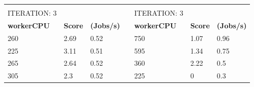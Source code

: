 \begin{table}[H]
\begin{tabular}{lllllll}
                                         &                                     &                                       &                                &                                         &                                     &                                       \\
ITERATION: 3                             &                                     &                                       &                                & ITERATION: 3                            &                                     &                                       \\ \cline{1-3} \cline{5-7} 
\multicolumn{1}{|l|}{\textbf{workerCPU}} & \multicolumn{1}{l|}{\textbf{Score}} & \multicolumn{1}{l|}{\textbf{(Jobs/s)}} & \multicolumn{1}{l|}{\textbf{}} & \multicolumn{1}{l|}{\textbf{workerCPU}} & \multicolumn{1}{l|}{\textbf{Score}} & \multicolumn{1}{l|}{\textbf{(Jobs/s)}} \\ \cline{1-3} \cline{5-7} 
\multicolumn{1}{|l|}{260}                & \multicolumn{1}{l|}{2.69}           & \multicolumn{1}{l|}{0.52}             & \multicolumn{1}{l|}{}          & \multicolumn{1}{l|}{750}                & \multicolumn{1}{l|}{1.07}           & \multicolumn{1}{l|}{0.96}             \\ \cline{1-3} \cline{5-7} 
\multicolumn{1}{|l|}{225}                & \multicolumn{1}{l|}{3.11}           & \multicolumn{1}{l|}{0.51}             & \multicolumn{1}{l|}{}          & \multicolumn{1}{l|}{595}                & \multicolumn{1}{l|}{1.34}           & \multicolumn{1}{l|}{0.75}             \\ \cline{1-3} \cline{5-7} 
\multicolumn{1}{|l|}{265}                & \multicolumn{1}{l|}{2.64}           & \multicolumn{1}{l|}{0.52}             & \multicolumn{1}{l|}{}          & \multicolumn{1}{l|}{360}                & \multicolumn{1}{l|}{2.22}           & \multicolumn{1}{l|}{0.5}              \\ \cline{1-3} \cline{5-7} 
\multicolumn{1}{|l|}{305}                & \multicolumn{1}{l|}{2.3}            & \multicolumn{1}{l|}{0.52}             & \multicolumn{1}{l|}{}          & \multicolumn{1}{l|}{225}                & \multicolumn{1}{l|}{0}              & \multicolumn{1}{l|}{0.3}              \\ \cline{1-3} \cline{5-7} 
\end{tabular}
\end{table}

